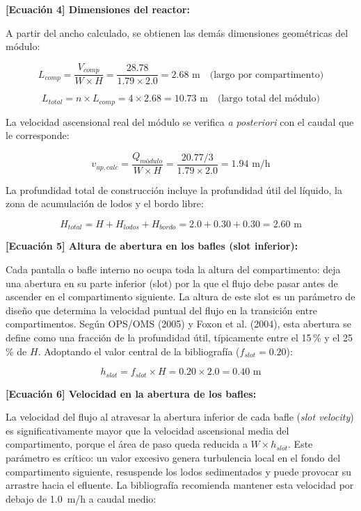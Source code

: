 \documentclass[12pt,a4paper]{article}
\begin{document}
\textbf{[Ecuación 4] Dimensiones del reactor:}

A partir del ancho calculado, se obtienen las demás dimensiones geométricas del módulo:

\begin{equation}
L_{comp} = \frac{V_{comp}}{W \times H} = \frac{28.78}{1.79 \times 2.0} = 2.68 \text{ m} \quad \text{(largo por compartimento)}
\end{equation}

\begin{equation}
L_{total} = n \times L_{comp} = 4 \times 2.68 = 10.73 \text{ m} \quad \text{(largo total del módulo)}
\end{equation}

La velocidad ascensional real del módulo se verifica \textit{a posteriori} con el caudal que le corresponde:

\begin{equation}
v_{up,calc} = \frac{Q_{módulo}}{W \times H} = \frac{20.77 / 3}{1.79 \times 2.0} = 1.94 \text{ m/h}
\end{equation}


La profundidad total de construcción incluye la profundidad útil del líquido, la zona de acumulación de lodos y el bordo libre:

\begin{equation}
H_{total} = H + H_{lodos} + H_{bordo} = 2.0 + 0.30 + 0.30 = 2.60 \text{ m}
\end{equation}

\textbf{[Ecuación 5] Altura de abertura en los bafles (slot inferior):}

Cada pantalla o bafle interno no ocupa toda la altura del compartimento: deja una abertura en su parte inferior (slot) por la que el flujo debe pasar antes de ascender en el compartimento siguiente. La altura de este slot es un parámetro de diseño que determina la velocidad puntual del flujo en la transición entre compartimentos. Según OPS/OMS (2005) y Foxon et al. (2004), esta abertura se define como una fracción de la profundidad útil, típicamente entre el 15\,\% y el 25\,\% de $H$. Adoptando el valor central de la bibliografía ($f_{slot} = 0.20$):

\begin{equation}
h_{slot} = f_{slot} \times H = 0.20 \times 2.0 = 0.40 \text{ m}
\end{equation}

\textbf{[Ecuación 6] Velocidad en la abertura de los bafles:}

La velocidad del flujo al atravesar la abertura inferior de cada bafle (\textit{slot velocity}) es significativamente mayor que la velocidad ascensional media del compartimento, porque el área de paso queda reducida a $W \times h_{slot}$. Este parámetro es crítico: un valor excesivo genera turbulencia local en el fondo del compartimento siguiente, resuspende los lodos sedimentados y puede provocar su arrastre hacia el efluente. La bibliografía recomienda mantener esta velocidad por debajo de 1.0~m/h a caudal medio:
\end{document}
